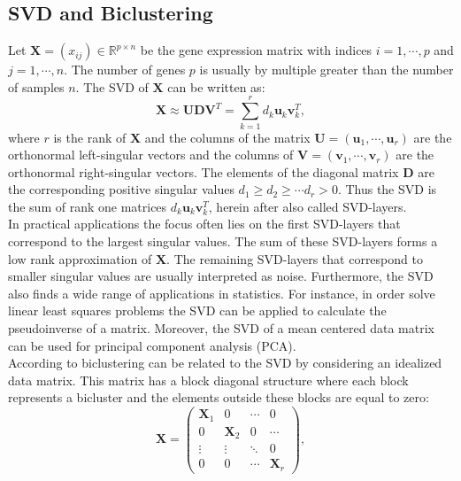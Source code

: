 \subsection{SVD and Biclustering}
Let $\mathbf{X}=(x_{ij}) \in \mathbb{R}^{p \times n}$  be the gene expression matrix with indices $i=1,\cdots,p$ and $j=1,\cdots,n$. The number of genes $p$ is usually by multiple greater than the number of samples $n$. The SVD of $\mathbf{X}$ can be written as:
\begin{equation}
 \mathbf{X} \approx \mathbf{U}\mathbf{D}\mathbf{V}^{T} = \sum_{k=1}^{r}d_{k}\mathbf{u}_{k}\mathbf{v}_{k}^{T},
\end{equation}
where $r$ is the rank of $\mathbf{X}$ and the columns of the matrix $\mathbf{U}=(\mathbf{u}_{1},\cdots,\mathbf{u}_{r})$ are the orthonormal left-singular vectors and the columns of $\mathbf{V}=(\mathbf{v}_{1},\cdots,\mathbf{v}_{r})$ are the orthonormal right-singular vectors. The elements of the diagonal matrix $\mathbf{D}$ are the corresponding positive singular values $d_{1} \geq d_{2} \geq \cdots d_{r} > 0$. 
Thus the SVD is the sum of rank one matrices $d_{k}\mathbf{u}_{k}\mathbf{v}_{k}^{T}$, herein after also called SVD-layers.\\
In practical applications the focus often lies on the first SVD-layers that correspond to the largest singular values. The sum of these SVD-layers forms a low rank approximation of $\mathbf{X}$. The remaining SVD-layers that correspond to smaller singular values are usually interpreted as noise. 
Furthermore, the SVD also finds a wide range of applications in statistics. For instance, in order solve linear least squares problems the SVD can be applied to calculate the pseudoinverse of a matrix. Moreover, the SVD of a mean centered data matrix can be used for principal component analysis (PCA).
\\
According to \citet{Busygin2008} biclustering can be related to the SVD by considering an idealized data matrix. This matrix has a block diagonal structure where each block represents a bicluster and the elements outside these blocks are equal to zero:
\begin{equation}
\mathbf{X}=
\begin{pmatrix} 
\mathbf{X}_{1} & 0 & \cdots & 0\\
0 & \mathbf{X}_{2} & 0 & \cdots \\
\vdots  & \vdots  & \ddots  & 0 \\
0 & 0 & \cdots & \mathbf{X}_{r}
\end{pmatrix},
\end{equation}
